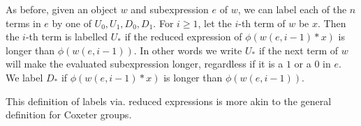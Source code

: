 As before, given an object $w$ and subexpression $e$ of $w$, we can label each of the $n$ terms in $e$ by one of $U_0, U_1, D_0, D_1$. For $i \geq 1$, let the $i$-th term of $w$ be $x$. Then the $i$-th term is labelled $U_*$ if the reduced expression of $\phi(w(e,i-1) * x)$ is longer than $\phi(w(e,i-1))$. In other words we write $U_*$ if the next term of $w$ will make the evaluated subexpression longer, regardless if it is a $1$ or a $0$ in $e$. We label $D_*$ if $\phi(w(e,i-1) * x)$ is longer than $\phi(w(e,i-1))$.



\begin{remark}
    This definition of labels via. reduced expressions is more akin to the general definition for Coxeter groups.
\end{remark}

